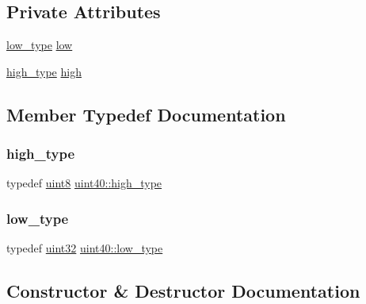 \subsection*{Private Attributes}
\begin{DoxyCompactItemize}
\item 
\hyperlink{classuint40_a92fb8d876ca5cf77d4ed86dae0adc2f2}{low\+\_\+type} \hyperlink{classuint40_a216fde2e6997b39cb34b32daa869cef3}{low}
\item 
\hyperlink{classuint40_a58afcd6aeb1ea1e103b8e85eb6aefec4}{high\+\_\+type} \hyperlink{classuint40_a830b04aa389a4e72c446cc88de38b656}{high}
\end{DoxyCompactItemize}


\subsection{Member Typedef Documentation}
\mbox{\label{classuint40_a58afcd6aeb1ea1e103b8e85eb6aefec4}} 
\subsubsection{\texorpdfstring{high\+\_\+type}{high\_type}}
{\footnotesize\ttfamily typedef \hyperlink{types_8h_a115946cb5fc5879545e9ccea096a6031}{uint8} \hyperlink{classuint40_a58afcd6aeb1ea1e103b8e85eb6aefec4}{uint40\+::high\+\_\+type}}

\mbox{\label{classuint40_a92fb8d876ca5cf77d4ed86dae0adc2f2}} 
\subsubsection{\texorpdfstring{low\+\_\+type}{low\_type}}
{\footnotesize\ttfamily typedef \hyperlink{types_8h_a8f95e75e58492e87412191fabadd8ca8}{uint32} \hyperlink{classuint40_a92fb8d876ca5cf77d4ed86dae0adc2f2}{uint40\+::low\+\_\+type}}



\subsection{Constructor \& Destructor Documentation}
\mbox{\label{classuint40_a457b73a04d5f5b2833155af392aaac96}} 
